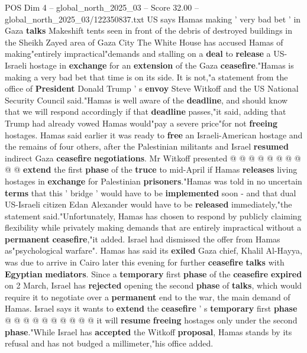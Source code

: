\begin{textsample}{POS Dim 4 – global\_north\_2025\_03 – Score 32.00 – global\_north\_2025\_03/122350837.txt}  \label{ex:f4_pos_064}
US says Hamas making ' very bad bet ' in Gaza \textbf{talks} Makeshift tents seen in front of the debris of destroyed buildings in the Sheikh Zayed area of Gaza City The White House has accused Hamas of making"entirely impractical"demands and stalling on a \textbf{deal} to \textbf{release} a US-Israeli hostage in \textbf{exchange} for an \textbf{extension} of the Gaza \textbf{ceasefire}."Hamas is making a very bad bet that time is on its side.
It is not,"a statement from the office of \textbf{President} Donald Trump ' s \textbf{envoy} Steve Witkoff and the US National Security Council said."Hamas is well aware of the \textbf{deadline}, and should know that we will respond accordingly if that \textbf{deadline} passes,"it said, adding that Trump had already vowed Hamas would"pay a severe price"for not \textbf{freeing} hostages.
Hamas said earlier it was ready to \textbf{free} an Israeli-American hostage and the remains of four others, after the Palestinian militants and Israel \textbf{resumed} indirect Gaza \textbf{ceasefire} \textbf{negotiations}.
Mr Witkoff presented @ @ @ @ @ @ @ @ @ @ \textbf{extend} the first \textbf{phase} of the \textbf{truce} to mid-April if Hamas \textbf{releases} living hostages in \textbf{exchange} for Palestinian \textbf{prisoners}."Hamas was told in no uncertain \textbf{terms} that this ' bridge ' would have to be \textbf{implemented} soon - and that dual US-Israeli citizen Edan Alexander would have to be \textbf{released} immediately,"the statement said."Unfortunately, Hamas has chosen to respond by publicly claiming flexibility while privately making demands that are entirely impractical without a \textbf{permanent} \textbf{ceasefire},"it added.
Israel had dismissed the offer from Hamas as"psychological warfare".
Hamas has said its \textbf{exiled} Gaza chief, Khalil Al-Hayya, was due to arrive in Cairo later this evening for further \textbf{ceasefire} \textbf{talks} with \textbf{Egyptian} \textbf{mediators}.
Since a \textbf{temporary} first \textbf{phase} of the \textbf{ceasefire} \textbf{expired} on 2 March, Israel has \textbf{rejected} opening the second \textbf{phase} of \textbf{talks}, which would require it to negotiate over a \textbf{permanent} end to the war, the main demand of Hamas.
Israel says it wants to \textbf{extend} the \textbf{ceasefire} ' s \textbf{temporary} first \textbf{phase} @ @ @ @ @ @ @ @ @ @ it will \textbf{resume} \textbf{freeing} hostages only under the second \textbf{phase}."While Israel has \textbf{accepted} the Witkoff \textbf{proposal}, Hamas stands by its refusal and has not budged a millimeter,"his office added.

\end{textsample}
